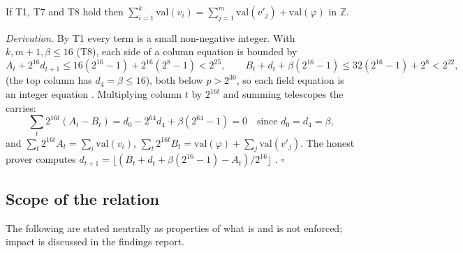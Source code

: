 \begin{property}
\label{prop:balance}
If T1, T7 and T8 hold then
$\sum_{i=1}^{k}\mathrm{val}(v_i) = \sum_{j=1}^{m}\mathrm{val}(v'_j)+\mathrm{val}(\varphi)$ in $\mathbb{Z}$.
\end{property}

\noindent\emph{Derivation.} By T1 every term is a small non-negative integer.
With $k,m+1,\beta\le 16$ (T8), each side of a column equation is bounded by
\[
  A_t + 2^{16}d_{t+1} \le 16(2^{16}-1) + 2^{16}(2^{8}-1) < 2^{25},\qquad
  B_t + d_t + \beta(2^{16}-1) \le 32(2^{16}-1) + 2^{8} < 2^{22},
\]
(the top column has $d_4=\beta\le16$), both below $p>2^{30}$, so each field
equation is an integer equation .
Multiplying column $t$ by $2^{16t}$ and summing telescopes the carries:
\[
  \sum_t 2^{16t}(A_t-B_t) = d_0 - 2^{64}d_4 + \beta(2^{64}-1) = 0
  \quad\text{since } d_0=d_4=\beta ,
\]
and $\sum_t 2^{16t}A_t=\sum_i\mathrm{val}(v_i)$,
$\sum_t 2^{16t}B_t=\mathrm{val}(\varphi)+\sum_j\mathrm{val}(v'_j)$.
The honest prover computes $d_{t+1}=\lfloor(B_t+d_t+\beta(2^{16}-1)-A_t)/2^{16}\rfloor$
. \hfill$\square$

\subsection{Scope of the relation}

The following are stated neutrally as properties of what is and is not
enforced; impact is discussed in the findings report.

